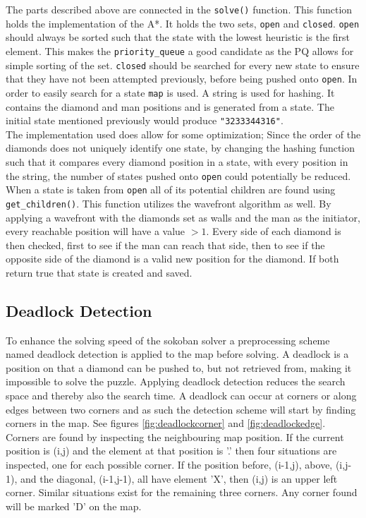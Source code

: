 The parts described above are connected in the \texttt{solve()} function. 
This function holds the implementation of the A*.
It holds the two sets, \texttt{open} and \texttt{closed}.
\texttt{open} should always be sorted such that the state with the lowest heuristic is the first element.
This makes the \texttt{priority\_queue} a good candidate as the PQ allows for simple sorting of the set.
\texttt{closed} should be searched for every new state to ensure that they have not been attempted previously, before being pushed onto \texttt{open}.
In order to easily search for a state \texttt{map} is used. 
A string is used for hashing. It contains the diamond and man positions and is generated from a state. 
The initial state mentioned previously would produce \texttt{"3233344316"}.\\
The implementation used does allow for some optimization;
Since the order of the diamonds does not uniquely identify one state, by changing the hashing function such that it compares every diamond position in a state, with every position in the string, the number of states pushed onto \texttt{open} could potentially be reduced.\\
When a state is taken from \texttt{open} all of its potential children are found using \texttt{get\_children()}. 
This function utilizes the wavefront algorithm as well.
By applying a wavefront with the diamonds set as walls and the man as the initiator, every reachable position will have a value $>1$.
Every side of each diamond is then checked, first to see if the man can reach that side, then to see if the opposite side of the diamond is a valid new position for the diamond.
If both return true that state is created and saved.

\subsection{Deadlock Detection}
To enhance the solving speed of the sokoban solver a preprocessing scheme named deadlock detection is applied to the map before solving.
A deadlock is a position on that a diamond can be pushed to, but not retrieved from, making it impossible to solve the puzzle. 
Applying deadlock detection reduces the search space and thereby also the search time.
A deadlock can occur at corners or along edges between two corners and as such the detection scheme will start by finding corners in the map.
See figures \ref{fig:deadlockcorner} and \ref{fig:deadlockedge}.
Corners are found by inspecting the neighbouring map position. 
If the current position is (i,j) and the element at that position is '.' then four situations are inspected, one for each possible corner. 
If the position before, (i-1,j), above, (i,j-1), and the diagonal, (i-1,j-1), all have element 'X', then (i,j) is an upper left corner. 
Similar situations exist for the remaining three corners.
Any corner found will be marked 'D' on the map.

